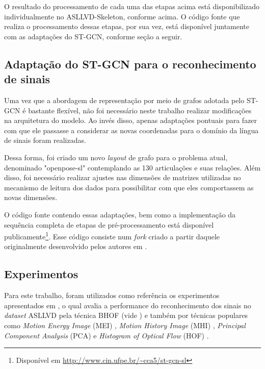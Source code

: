 O resultado do processamento de cada uma das etapas acima está disponibilizado individualmente no ASLLVD-Skeleton, conforme acima. O código fonte que realiza o processamento dessas etapas, por sua vez, está disponível juntamente com as adaptações do ST-GCN, conforme seção a seguir.


\subsection{Adaptação do ST-GCN para o reconhecimento de sinais} %
\label{sec:adaptacao-st-gcn}

Uma vez que a abordagem de representação por meio de grafos adotada pelo ST-GCN é bastante flexível, não foi necessário neste trabalho realizar modificações na arquitetura do modelo. Ao invés disso, apenas adaptações pontuais para fazer com que ele passasse a considerar as novas coordenadas para o domínio da língua de sinais foram realizadas. 

Dessa forma, foi criado um novo \textit{layout} de grafo para o problema atual, denominado "openpose-sl" contemplando as 130 articulações e suas relações. Além disso, foi necessário realizar ajustes nas dimensões de matrizes utilizadas no mecanismo de leitura dos dados para possibilitar com que eles comportassem as novas dimensões.

O código fonte contendo essas adaptações, bem como a implementação da sequência completa de etapas de pré-processamento está disponível publicamente\footnote{
    Disponível em \url{http://www.cin.ufpe.br/~cca5/st-gcn-sl}
}. Esse código consiste num \textit{fork} criado a partir daquele originalmente desenvolvido pelos autores em \cite{st-gcn-2018}.



\subsection{Experimentos} %
\label{experimentos}

Para este trabalho, foram utilizados como referência os experimentos apresentados em \cite{lim-2016}, o qual avalia a performance do reconhecimento dos sinais no \textit{dataset} ASLLVD pela técnica BHOF (vide ) e também por técnicas populares como \textit{Motion Energy Image} (MEI) \cite{athitsos-asllvd-2008}, \textit{Motion History Image} (MHI) \cite{babu-2004}, \textit{Principal Component Analysis} (PCA) \cite{dreuw-2012} e \textit{Histogram of Optical Flow} (HOF) \cite{laptev-2008}. 

